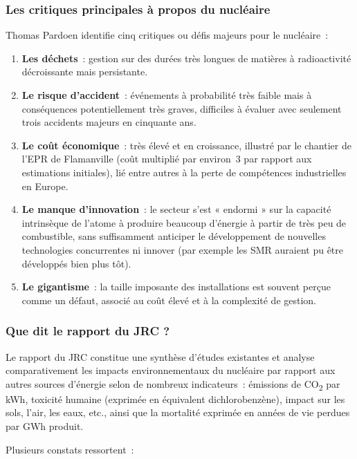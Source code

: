 \subsubsection{Les critiques principales à propos du nucléaire}

Thomas Pardoen identifie cinq critiques ou défis majeurs pour le nucléaire~:

\begin{enumerate}
    \item \textbf{Les déchets}~: gestion sur des durées très longues de matières à radioactivité décroissante mais persistante.
    \item \textbf{Le risque d'accident}~: événements à probabilité très faible mais à conséquences potentiellement très graves, difficiles à évaluer avec seulement trois accidents majeurs en cinquante ans.
    \item \textbf{Le coût économique}~: très élevé et en croissance, illustré par le chantier de l'EPR de Flamanville (coût multiplié par environ~3 par rapport aux estimations initiales), lié entre autres à la perte de compétences industrielles en Europe.
    \item \textbf{Le manque d'innovation}~: le secteur s'est « endormi » sur la capacité intrinsèque de l'atome à produire beaucoup d'énergie à partir de très peu de combustible, sans suffisamment anticiper le développement de nouvelles technologies concurrentes ni innover (par exemple les SMR auraient pu être développés bien plus tôt).
    \item \textbf{Le gigantisme}~: la taille imposante des installations est souvent perçue comme un défaut, associé au coût élevé et à la complexité de gestion.
\end{enumerate}

\subsubsection{Que dit le rapport du JRC ?}

Le rapport du JRC constitue une synthèse d'études existantes et analyse comparativement les impacts environnementaux du nucléaire par rapport aux autres sources d'énergie selon de nombreux indicateurs~: émissions de CO\textsubscript{2} par kWh, toxicité humaine (exprimée en équivalent dichlorobenzène), impact sur les sols, l'air, les eaux, etc., ainsi que la mortalité exprimée en années de vie perdues par GWh produit.

Plusieurs constats ressortent~:

